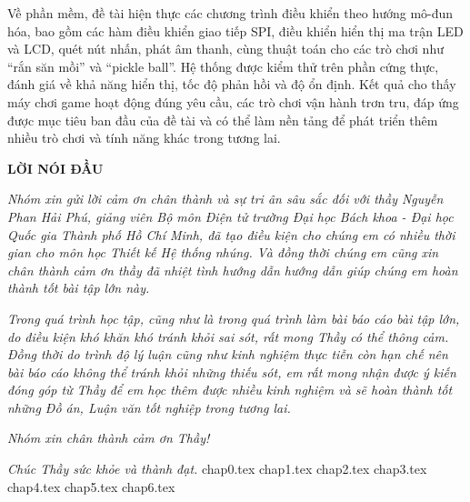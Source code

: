 \documentclass[12pt, a4paper, oneside]{article}
\begin{document}
Về phần mềm, đề tài hiện thực các chương trình điều khiển theo hướng mô-đun hóa, bao gồm các hàm điều khiển giao tiếp SPI, điều khiển hiển thị ma trận LED và LCD, quét nút nhấn, phát âm thanh, cùng thuật toán cho các trò chơi như “rắn săn mồi” và “pickle ball”. Hệ thống được kiểm thử trên phần cứng thực, đánh giá về khả năng hiển thị, tốc độ phản hồi và độ ổn định. Kết quả cho thấy máy chơi game hoạt động đúng yêu cầu, các trò chơi vận hành trơn tru, đáp ứng được mục tiêu ban đầu của đề tài và có thể làm nền tảng để phát triển thêm nhiều trò chơi và tính năng khác trong tương lai.

\newpage
\onehalfspacing
\tableofcontents
\thispagestyle{empty}
\newpage
\listoffigures
\thispagestyle{empty}
\newpage
\thispagestyle{empty}
\begin{center}
    \textbf{LỜI NÓI ĐẦU}
\end{center}

\textit{Nhóm xin gửi lời cảm ơn chân thành và sự tri ân sâu sắc đối với thầy Nguyễn Phan Hải Phú, giảng viên Bộ môn Điện tử trường Đại học Bách khoa - Đại học Quốc gia Thành phố Hồ Chí Minh, đã tạo điều kiện cho chúng em có nhiều thời gian cho môn học Thiết kế Hệ thống nhúng. Và đồng thời chúng em cũng xin chân thành cảm ơn thầy đã nhiệt tình hướng dẫn hướng dẫn giúp chúng em hoàn thành tốt bài tập lớn này.}

\textit{Trong quá trình học tập, cũng như là trong quá trình làm bài báo cáo bài tập lớn, do điều kiện khó khăn khó tránh khỏi sai sót, rất mong Thầy có thể thông cảm. Đồng thời do trình độ lý luận cũng như kinh nghiệm thực tiễn còn hạn chế nên bài báo cáo không thể tránh khỏi những thiếu sót, em rất mong nhận được ý kiến đóng góp từ Thầy để em học thêm được nhiều kinh nghiệm và sẽ hoàn thành tốt những Đồ án, Luận văn tốt nghiệp trong tương lai.}

\textit{Nhóm xin chân thành cảm ơn Thầy!}

\textit{Chúc Thầy sức khỏe và thành đạt.}
\newpage
\setcounter{page}{1}
{chap0.tex}
\newpage
{chap1.tex}
\newpage
{chap2.tex}
\newpage
{chap3.tex}
\newpage
{chap4.tex}
\newpage
{chap5.tex}
\newpage
{chap6.tex}
\end{document}
